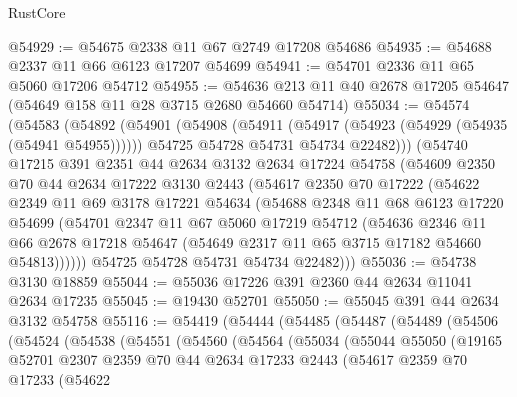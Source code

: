 \begin{lexlean}{RustCore}
\begin{coremodule}
@54929 := @54675 @2338 @11 @67 @2749 @17208 @54686
@54935 := @54688 @2337 @11 @66 @6123 @17207 @54699
@54941 := @54701 @2336 @11 @65 @5060 @17206 @54712
@54955 := @54636 @213 @11 @40 @2678 @17205 @54647 (@54649 @158 @11 @28 @3715 @2680 @54660 @54714)
@55034 := @54574
    (@54583
      (@54892
        (@54901
          (@54908
            (@54911 (@54917 (@54923 (@54929 (@54935 (@54941 @54955))))))
            @54725
            @54728
            @54731
            @54734
            @22482)))
      (@54740
        @17215
        @391
        @2351
        @44
        @2634
        @3132
        @2634
        @17224
        @54758
        (@54609
          @2350
          @70
          @44
          @2634
          @17222
          @3130
          @2443
          (@54617
            @2350
            @70
            @17222
            (@54622
              @2349
              @11
              @69
              @3178
              @17221
              @54634
              (@54688
                @2348
                @11
                @68
                @6123
                @17220
                @54699
                (@54701
                  @2347
                  @11
                  @67
                  @5060
                  @17219
                  @54712
                  (@54636
                    @2346
                    @11
                    @66
                    @2678
                    @17218
                    @54647
                    (@54649 @2317 @11 @65 @3715 @17182 @54660 @54813))))))
          @54725
          @54728
          @54731
          @54734
          @22482)))
@55036 := @54738 @3130 @18859
@55044 := @55036 @17226 @391 @2360 @44 @2634 @11041 @2634 @17235
@55045 := @19430 @52701
@55050 := @55045 @391 @44 @2634 @3132 @54758
@55116 := @54419
    (@54444
      (@54485
        (@54487
          (@54489
            (@54506
              (@54524
                (@54538
                  (@54551
                    (@54560
                      (@54564
                        (@55034
                          (@55044
                            @55050
                            (@19165
                              @52701
                              @2307
                              @2359
                              @70
                              @44
                              @2634
                              @17233
                              @2443
                              (@54617
                                @2359
                                @70
                                @17233
                                (@54622

\end{coremodule}
\end{lexlean}
